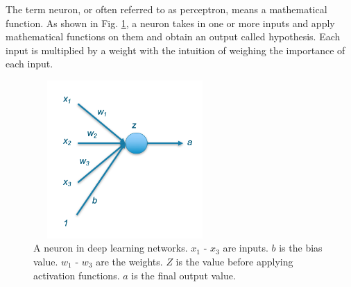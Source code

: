 The term neuron, or often referred to as perceptron, means a mathematical function. As shown in Fig. \ref{fig_neuron}, a neuron takes in one or more inputs and apply mathematical functions on them and obtain an output called hypothesis. Each input is multiplied by a weight with the intuition of weighing the importance of each input.
\begin{figure}[h!]
\begin{center}
\includegraphics[height = 6cm, width = 7cm]{img/neuron.png}
\caption{A neuron in deep learning networks. $x_1$ - $x_3$ are inputs. $b$ is the bias value. $w_1$ - $w_3$ are the weights. $Z$ is the value before applying activation functions. $a$ is the final output value.\label{fig_neuron}}
\end{center}
\end{figure}

